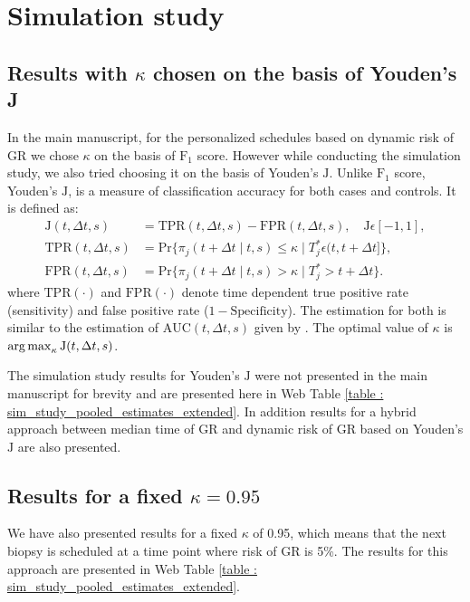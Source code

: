 \section{Simulation study}

\subsection{Results with $\kappa$ chosen on the basis of Youden's J}
In the main manuscript, for the personalized schedules based on dynamic risk of GR we chose $\kappa$ on the basis of $\mbox{F}_1$ score. However while conducting the simulation study, we also tried choosing it on the basis of Youden's $\mbox{J}$. Unlike $\mbox{F}_1$ score, Youden's $\mbox{J}$, is a measure of classification accuracy for both cases and controls. It is defined as:
\begin{align*}
\mbox{J}(t, \Delta t, s) &= \text{TPR}(t, \Delta t, s) - \text{FPR}(t, \Delta t, s), \quad \mbox{J}\epsilon [-1,1],\\
\text{TPR}(t, \Delta t, s) &= \mbox{Pr}\big\{\pi_j(t + \Delta t \mid t,s) \leq \kappa \mid T^*_j \epsilon (t, t + \Delta t]\big\},\\
\text{FPR}(t, \Delta t, s) &= \mbox{Pr}\big\{\pi_j(t + \Delta t \mid t,s) > \kappa \mid T^*_j > t + \Delta t \big\}.
\end{align*}
where $\mbox{TPR}(\cdot)$ and $\mbox{FPR}(\cdot)$ denote time dependent true positive rate (sensitivity) and false positive rate ($1 - \mbox{Specificity}$). The estimation for both is similar to the estimation of $\mbox{AUC}(t, \Delta t, s)$ given by \citet{landmarking2017}. The optimal value of $\kappa$ is $\operatorname{arg\,max}_{\kappa} \mbox{J}(t, \Delta t, s)$.

The simulation study results for Youden's $\mbox{J}$ were not presented in the main manuscript for brevity and are presented here in Web Table \ref{table : sim_study_pooled_estimates_extended}. In addition results for a hybrid approach between median time of GR and dynamic risk of GR based on Youden's $\mbox{J}$ are also presented. 

\subsection{Results for a fixed $\kappa = 0.95$}
We have also presented results for a fixed $\kappa$ of 0.95, which means that the next biopsy is scheduled at a time point where risk of GR is 5\%. The results for this approach are presented in Web Table \ref{table : sim_study_pooled_estimates_extended}.


